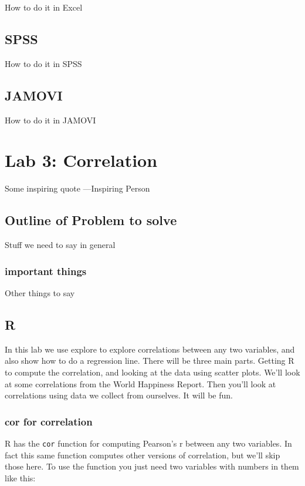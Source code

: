 \documentclass[]{book}
\theoremstyle{definition}
\theoremstyle{definition}
\theoremstyle{definition}
\theoremstyle{remark}
\begin{document}
How to do it in Excel

\section{SPSS}\label{spss-1}

How to do it in SPSS

\section{JAMOVI}\label{jamovi-1}

How to do it in JAMOVI

\chapter{Lab 3: Correlation}\label{lab-3-correlation}

{ Some inspiring quote ---Inspiring Person }

\section{Outline of Problem to
solve}\label{outline-of-problem-to-solve-1}

Stuff we need to say in general

\subsection{important things}\label{important-things-1}

Other things to say

\section{R}\label{r-3}

In this lab we use explore to explore correlations between any two
variables, and also show how to do a regression line. There will be
three main parts. Getting R to compute the correlation, and looking at
the data using scatter plots. We'll look at some correlations from the
World Happiness Report. Then you'll look at correlations using data we
collect from ourselves. It will be fun.

\subsection{cor for correlation}\label{cor-for-correlation}

R has the \texttt{cor} function for computing Pearson's r between any
two variables. In fact this same function computes other versions of
correlation, but we'll skip those here. To use the function you just
need two variables with numbers in them like this:
\end{document}
